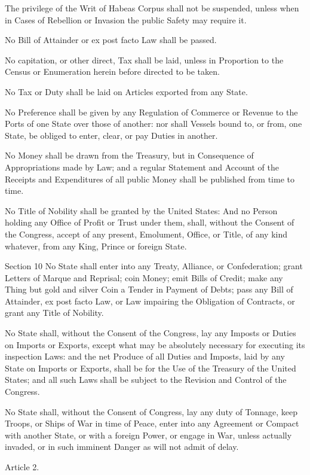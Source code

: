 \documentclass{article}
\begin{document}
The privilege of the Writ of Habeas Corpus shall not be suspended, unless when
in Cases of Rebellion or Invasion the public Safety may require it.

No Bill of Attainder or ex post facto Law shall be passed.

No capitation, or other direct, Tax shall be laid, unless in Proportion to the
Census or Enumeration herein before directed to be taken.

No Tax or Duty shall be laid on Articles exported from any State.

No Preference shall be given by any Regulation of Commerce or Revenue to the
Ports of one State over those of another: nor shall Vessels bound to, or from,
one State, be obliged to enter, clear, or pay Duties in another.

No Money shall be drawn from the Treasury, but in Consequence of Appropriations
made by Law; and a regular Statement and Account of the Receipts and
Expenditures of all public Money shall be published from time to time.

No Title of Nobility shall be granted by the United States: And no Person
holding any Office of Profit or Trust under them, shall, without the Consent of
the Congress, accept of any present, Emolument, Office, or Title, of any kind
whatever, from any King, Prince or foreign State.

Section 10
No State shall enter into any Treaty, Alliance, or Confederation; grant Letters
of Marque and Reprisal; coin Money; emit Bills of Credit; make any Thing but
gold and silver Coin a Tender in Payment of Debts; pass any Bill of Attainder,
ex post facto Law, or Law impairing the Obligation of Contracts, or grant any
Title of Nobility.

No State shall, without the Consent of the Congress, lay any Imposts or Duties
on Imports or Exports, except what may be absolutely necessary for executing
its inspection Laws: and the net Produce of all Duties and Imposts, laid by
any State on Imports or Exports, shall be for the Use of the Treasury of the
United States; and all such Laws shall be subject to the Revision and Control
of the Congress.

No State shall, without the Consent of Congress, lay any duty of Tonnage, keep
Troops, or Ships of War in time of Peace, enter into any Agreement or Compact
with another State, or with a foreign Power, or engage in War, unless actually
invaded, or in such imminent Danger as will not admit of delay.

Article 2.
\end{document}
